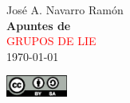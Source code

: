 %

\newcommand*{\titleTH}{\begingroup%
\raggedleft
\vspace*{\baselineskip}
{\Large José A. Navarro Ramón}\\[0.167\textheight]
{\bfseries Apuntes de}\\[\baselineskip]
{\textcolor{red}{\Huge GRUPOS DE LIE}}\\[\baselineskip]
\vspace{2ex}
\today\par
\vspace{20ex}
{\Large \includegraphics[width=2.0cm]{./img/by-sa.eps}}\par
\vspace*{3\baselineskip}
\endgroup}

\titleTH


